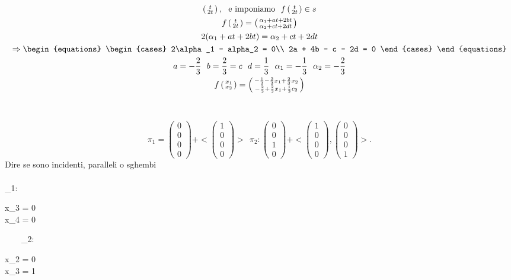 \documentclass[12px]{article}
\theoremstyle{break}
\theoremstyle{break}
\theoremstyle{break}
\theoremstyle{break}
\theoremstyle{break}
\theoremstyle{break}
\theoremstyle{breal}
\newcommand{\icol}[1]{%
  \left(\begin{smallmatrix}#1\end{smallmatrix}\right)%
}
\begin{document}
\begin{gather*}
	\icol{t \\2t}, \ \ \text{e imponiamo} \ \ f\icol{t\\2t}\in s \\
	f\icol{t\\2t} = \icol{\alpha_1 + at + 2bt\\\alpha_2 + ct + 2dt} \\
	2(\alpha_1 + at + 2bt) = \alpha_2 + ct + 2dt \\
	\Rightarrow 
	\begin{equations}
		\begin{cases}
			2\alpha_1 - alpha_2 = 0\\
			2a + 4b - c - 2d = 0 
		\end{cases}
	\end{equations}\\
	a = - \frac{2}{3} \ \ b = \frac{2}{3} = c \ \ d = \frac{1}{3} \ \ \alpha_1 = - \frac{1}{3} \ \ \alpha_2 = - \frac{2}{3} \\
	f\icol{x_1 \\ x_2} = \icol{-\frac{1}{3} -\frac{2}{3}x_1 + \frac{2}{3}x_2\\ - \frac{2}{3} + \frac{2}{3}x_1 + \frac{1}{3}c_2}
\end{gather*}
\\
\hfill \ \\
\[
	\pi_1 = \icol{0 \\ 0\\ 0\\ 0 } + <\icol{1 \\ 0\\0\\0}> \ \ \pi_2: \icol{0\\0\\1\\0} + <\icol{1 \\ 0 \\0 \\0},\icol{0\\0\\0\\1}>
.\] 
Dire se sono incidenti, paralleli o sghembi\\
\hfill
\\
\pi_1: \begin{equations}
	\begin{cases}
		x_3 = 0 \\
		x_4 = 0
	\end{cases}
\end{equations} \ \ \ \ 
\pi_2: \begin{equations}
	\begin{cases}
		x_2 = 0\\
		x_3 = 1
	\end{cases}
\end{equations}
\end{document}
